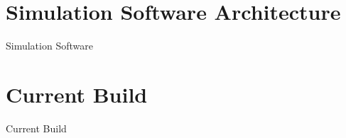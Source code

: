 \documentclass[a4paper,12pt]{article}
\begin{document}
\section{Simulation Software Architecture}
Simulation Software

\section{Current Build}
Current Build

\cite{cts12}


\end{document}
